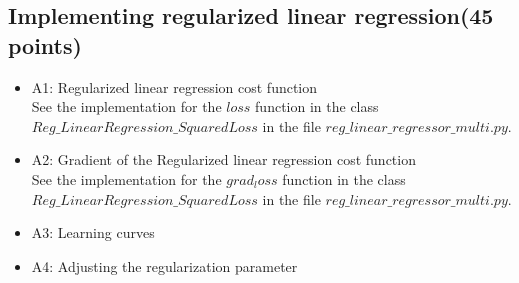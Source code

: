 \documentclass{article}
\begin{document}
\subsection{Implementing regularized linear regression(45 points)}
\begin{itemize}
    \item A1: Regularized linear regression cost function\\
    See the implementation for the $loss$ function in the class $Reg\_LinearRegression\_SquaredLoss$ in the file $reg\_linear\_regressor\_multi.py$.\\
    \item A2: Gradient of the Regularized linear regression cost function\\
    See the implementation for the $grad_loss$ function in the class $Reg\_LinearRegression\_SquaredLoss$ in the file $reg\_linear\_regressor\_multi.py$.\\
    \item A3: Learning curves\\
    \item A4: Adjusting the regularization parameter\\
    \begin{figure}[htbp]
    \centering
\end{figure}
\end{itemize}
\end{document}
